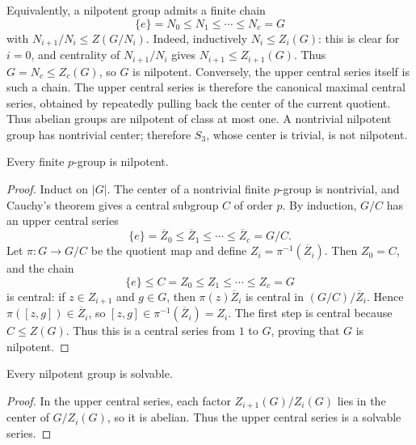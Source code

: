 Equivalently, a nilpotent group admits a finite chain
\[
\{e\}=N_0\leq N_1\leq\cdots\leq N_c=G
\]
with \(N_{i+1}/N_i\leq Z(G/N_i)\).  Indeed, inductively
\(N_i\leq Z_i(G)\): this is clear for \(i=0\), and centrality of
\(N_{i+1}/N_i\) gives \(N_{i+1}\leq Z_{i+1}(G)\).  Thus
\(G=N_c\leq Z_c(G)\), so \(G\) is nilpotent.  Conversely, the upper central
series itself is such a chain.  The upper central series is therefore the
canonical maximal central series, obtained by repeatedly pulling back the
center of the current quotient.  Thus abelian groups are nilpotent of class
at most one.  A nontrivial nilpotent group has nontrivial center; therefore
\(S_3\), whose center is trivial, is not nilpotent.

\begin{theorem}
Every finite \(p\)-group is nilpotent.
\end{theorem}
\begin{proof}
Induct on \(|G|\).  The center of a nontrivial finite \(p\)-group is
nontrivial, and Cauchy's theorem gives a central subgroup \(C\) of order
\(p\).  By induction, \(G/C\) has an upper central series
\[
 \{e\}=\overline Z_0\leq\overline Z_1\leq\cdots\leq\overline Z_c=G/C.
\]
Let \(\pi:G\to G/C\) be the quotient map and define
\(Z_i=\pi^{-1}(\overline Z_i)\). Then
\(Z_0=C\), and the chain
\[
 \{e\}\leq C=Z_0\leq Z_1\leq\cdots\leq Z_c=G
\]
is central: if \(z\in Z_{i+1}\) and \(g\in G\), then
\(\pi(z)\overline Z_i\) is central in
\((G/C)/\overline Z_i\). Hence
\(\pi([z,g])\in\overline Z_i\), so
\([z,g]\in\pi^{-1}(\overline Z_i)=Z_i\). The first step
is central because \(C\leq Z(G)\).  Thus this is a central series from
\(1\) to \(G\), proving that \(G\) is nilpotent.
\end{proof}

\begin{proposition}
Every nilpotent group is solvable.
\end{proposition}
\begin{proof}
In the upper central series, each factor
\(Z_{i+1}(G)/Z_i(G)\) lies in the center of \(G/Z_i(G)\), so it is abelian.
Thus the upper central series is a solvable series.
\end{proof}

